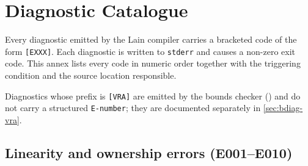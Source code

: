 \chapter{Diagnostic Catalogue}
\label{annex:B-diagnostics-impl}

\pnum
Every diagnostic emitted by the Lain compiler carries a bracketed code of
the form \texttt{[EXXX]}.  Each diagnostic is written to \texttt{stderr} and
causes a non-zero exit code.  This annex lists every code in numeric order
together with the triggering condition and the source location responsible.

\pnum
Diagnostics whose prefix is \texttt{[VRA]} are emitted by the bounds checker
() and do not carry a structured \texttt{E-number};
they are documented separately in \cref{sec:bdiag-vra}.

\section{Linearity and ownership errors (E001–E010)}
\label{sec:bdiag-linearity}

